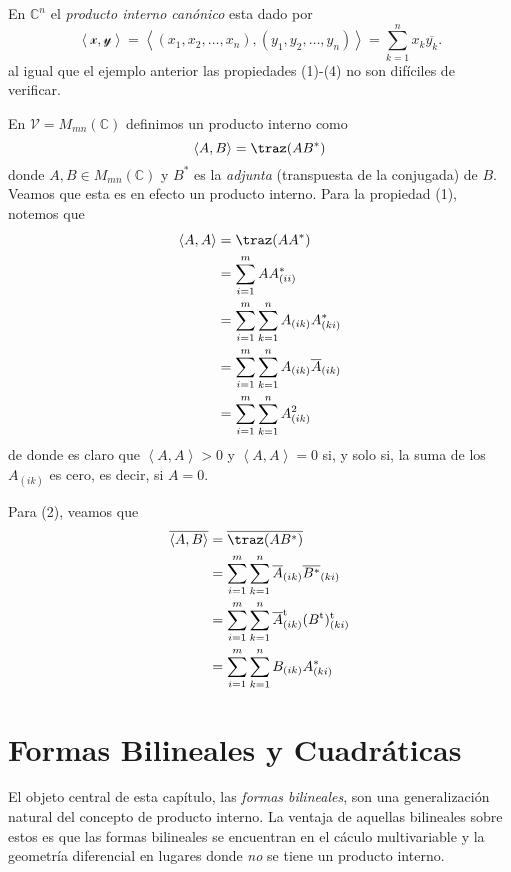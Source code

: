 \documentclass[twocolumn]{notasdeclase}
\newcommand{\ve}[1]{\mathscr{#1}}
\newcommand{\V}{\mathcal{V}}
\newcommand{\Iprod}[2]{\left\langle#1,#2\right\rangle}
\newcommand{\dt}[2]{#1_1 #2 #1_2 #2 \dots #2 #1_n}
\newcommand{\Cn}{\mathbb{C}^n}
\newcommand{\Co}{\mathbb{C}}
\begin{document}
\begin{ejem}
	En $\Cn$ el \emph{producto interno canónico} esta dado por
	\[ \Iprod{\ve x}{\ve y} = \Iprod{(\dt{x}{,})}{(\dt{y}{,})} = \sum_{k=1}^{n} x_k\overline{y_k}.\]
	al igual que el ejemplo anterior las propiedades (1)-(4) no son difíciles de verificar.
\end{ejem}
\begin{ejem}
	En $\V= M_{mn}(\Co)$ definimos un producto interno como
	\[ \Iprod{A}{B} = \traz(AB^\ast) \]
	donde $A,B\in M_{mn}(\Co)$ y $B^\ast$ es la \emph{adjunta} (transpuesta de la conjugada) de $B$. Veamos que esta es en efecto un producto interno.
	Para la propiedad (1), notemos que
	\begin{align*}
		\Iprod{A}{A}  &= \traz(AA^\ast) \\
					  &= \sum_{i=1}^{m} AA^\ast_{(ii)} \\
					  &= \sum_{i=1}^{m}\sum_{k=1}^{n} A_{(ik)}A^\ast_{(ki)} \\
					  &= \sum_{i=1}^{m}\sum_{k=1}^{n} A_{(ik)}\overline{A}_{(ik)} \\
					  &= \sum_{i=1}^{m}\sum_{k=1}^{n} A^2_{(ik)}
	\end{align*}
	de donde es claro que $\Iprod{A}{A}>0$ y $\Iprod{A}{A} = 0$ si, y solo si, la suma de los $A_{(ik)}$ es cero, es decir, si $A=0$.
	
	Para (2), veamos que
	\begin{align*}
		\overline{\Iprod{A}{B}} &= \overline{\traz(AB^\ast)} \\
					 			&= \sum_{i=1}^{m}\sum_{k=1}^{n} \overline{A}_{(ik)}\overline{B^\ast}_{(ki)} \\
					 			&= \sum_{i=1}^{m}\sum_{k=1}^{n} \overline{A}_{(ik)}^\mathrm t(B^\mathrm t)^\mathrm t_{(ki)} \\
					 			&= \sum_{i=1}^{m}\sum_{k=1}^{n} B_{(ik)}A_{(ki)}^\ast
	\end{align*}
\end{ejem}
\chapter{Formas Bilineales y Cuadráticas}

El objeto central de esta capítulo, las \emph{formas bilineales}, son una generalización natural del concepto de producto interno. La ventaja de aquellas \textsf{bilineales} sobre estos es que las formas bilineales se encuentran en el cáculo multivariable y la geometría diferencial en lugares donde \emph{no} se tiene un producto interno.
\end{document}
